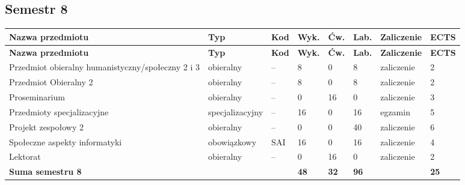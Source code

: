 \documentclass[12pt,a4paper]{article}
\newcommand{\thdrule}{\noalign{\global\setlength{\extrarowheight}{0pt}}}
\newcommand{\thdend}{\noalign{\global\setlength{\extrarowheight}{4pt}}}
\begin{document}
\subsection*{Semestr 8}

{\scriptsize
\begin{longtable}{m{5.0cm}m{1.9cm}m{0.75cm}m{0.85cm}m{0.85cm}m{0.85cm}m{1.45cm}m{0.9cm}}
\thdrule\toprule
\rowcolor{pjatkRed}
{\color{white}\footnotesize\textbf{\vphantom{Ag}Nazwa przedmiotu}} & {\color{white}\footnotesize\textbf{\vphantom{Ag}Typ}} & {\color{white}\footnotesize\textbf{\vphantom{Ag}Kod}} & {\color{white}\footnotesize\textbf{\vphantom{Ag}Wyk.}} & {\color{white}\footnotesize\textbf{\vphantom{Ag}Ćw.}} & {\color{white}\footnotesize\textbf{\vphantom{Ag}Lab.}} & {\color{white}\footnotesize\textbf{\vphantom{Ag}Zaliczenie}} & {\color{white}\footnotesize\textbf{\vphantom{Ag}ECTS}} \\
\midrule\thdend
\endfirsthead
\thdrule\toprule
\rowcolor{pjatkRed}
{\color{white}\footnotesize\textbf{\vphantom{Ag}Nazwa przedmiotu}} & {\color{white}\footnotesize\textbf{\vphantom{Ag}Typ}} & {\color{white}\footnotesize\textbf{\vphantom{Ag}Kod}} & {\color{white}\footnotesize\textbf{\vphantom{Ag}Wyk.}} & {\color{white}\footnotesize\textbf{\vphantom{Ag}Ćw.}} & {\color{white}\footnotesize\textbf{\vphantom{Ag}Lab.}} & {\color{white}\footnotesize\textbf{\vphantom{Ag}Zaliczenie}} & {\color{white}\footnotesize\textbf{\vphantom{Ag}ECTS}} \\
\midrule\thdend
\endhead
\rowcolor{tableElective} Przedmiot obieralny humanistyczny/społeczny 2 i 3 & {\scriptsize obieralny} & -- & 8 & 0 & 8 & {\scriptsize zaliczenie} & 2 \\
\rowcolor{tableElective} Przedmiot Obieralny 2 & {\scriptsize obieralny} & -- & 8 & 0 & 8 & {\scriptsize zaliczenie} & 2 \\
\rowcolor{tableElective} Proseminarium & {\scriptsize obieralny} & -- & 0 & 16 & 0 & {\scriptsize zaliczenie} & 3 \\
\rowcolor{tableElective} Przedmioty specjalizacyjne & {\scriptsize specjalizacyjny} & -- & 16 & 0 & 16 & {\scriptsize egzamin} & 5 \\
\rowcolor{tableElective} Projekt zespołowy 2 & {\scriptsize obieralny} & -- & 0 & 0 & 40 & {\scriptsize zaliczenie} & 6 \\
\rowcolor{tableRowAlt} Społeczne aspekty informatyki & {\scriptsize obowiązkowy} & SAI & 16 & 0 & 16 & {\scriptsize zaliczenie} & 4 \\
\rowcolor{tableElective} Lektorat & {\scriptsize obieralny} & -- & 0 & 16 & 0 & {\scriptsize zaliczenie} & 2 \\
\midrule[\heavyrulewidth]
\rowcolor{tableSummary} \textbf{Suma semestru 8} & & & \textbf{48} & \textbf{32} & \textbf{96} & & \textbf{25} \\
\bottomrule
\end{longtable}}
\end{document}
